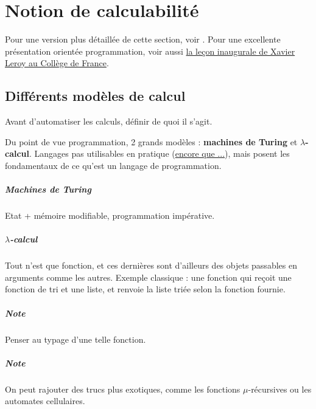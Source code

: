 
\chapter{Notion de calculabilité}

Pour une version plus détaillée de cette section, voir \cite{dowek}. Pour une excellente présentation orientée programmation, voir aussi \href{https://www.college-de-france.fr/site/xavier-leroy/inaugural-lecture-2018-11-15-18h00.htm}{la leçon inaugurale de Xavier Leroy au Collège de France}.

\section{Différents modèles de calcul}

Avant d'automatiser les calculs, définir de quoi il s'agit.

Du point de vue programmation, 2 grands modèles : \textbf{machines de Turing} et  \textbf{$\lambda$-calcul}. Langages pas utilisables en pratique (\href{http://www.ens-lyon.fr/actualite/lecole/la-machine-de-turing-en-legos}{encore que ...}), mais posent les fondamentaux de ce qu'est un langage de programmation.

\paragraph{Machines de Turing} Etat + mémoire modifiable, programmation impérative.

\paragraph{$\lambda$-calcul} Tout n'est que fonction, et ces dernières sont d'ailleurs des objets passables en arguments comme les autres. Exemple classique : une fonction qui reçoit une fonction de tri et une liste, et renvoie la liste triée selon la fonction fournie.

\paragraph{Note} Penser au typage d'une telle fonction. 

\paragraph{Note}On peut rajouter des trucs plus exotiques, comme les fonctions $\mu$-récursives ou les automates cellulaires.

